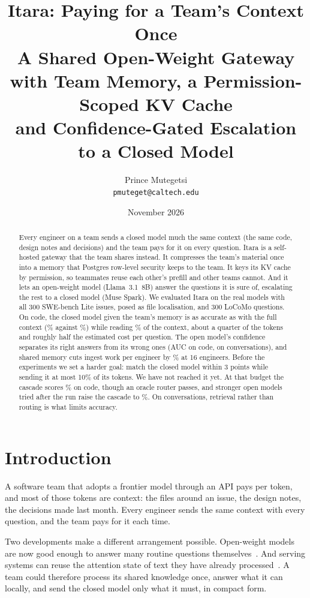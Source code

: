 \documentclass[10pt,twocolumn]{article}
\title{\textbf{Itara: Paying for a Team's Context Once}\\[2pt]
\large A Shared Open-Weight Gateway with Team Memory, a Permission-Scoped KV Cache\\ and Confidence-Gated Escalation to a Closed Model}
\author{Prince Mutegetsi\\\texttt{pmuteget@caltech.edu}}
\date{November 2026}
\begin{document}
\maketitle

\begin{abstract}
Every engineer on a team sends a closed model much the same context (the same code, design notes and decisions) and the team pays for it on every question. Itara is a self-hosted gateway that the team shares instead. It compresses the team's material once into a memory that Postgres row-level security keeps to the team. It keys its KV cache by permission, so teammates reuse each other's prefill and other teams cannot. And it lets an open-weight model (Llama~3.1~8B) answer the questions it is sure of, escalating the rest to a closed model (Muse Spark). We evaluated Itara on the real models with all 300 SWE-bench Lite issues, posed as file localisation, and 300 LoCoMo questions. On code, the closed model given the team's memory is as accurate as with the full context (\accSweCompact\% against \accSweDirect\%) while reading \% of the context, about a quarter of the tokens and roughly half the estimated cost per question. The open model's confidence separates its right answers from its wrong ones (AUC \aucSwe{} on code, \aucLoco{} on conversations), and shared memory cuts ingest work per engineer by \dropSharedRelated\% at 16 engineers. Before the experiments we set a harder goal: match the closed model within 3 points while sending it at most 10\% of its tokens. We have not reached it yet. At that budget the cascade scores \cascadeSwe\% on code, though an oracle router passes, and stronger open models tried after the run raise the cascade to \glimCascadeTen\%. On conversations, retrieval rather than routing is what limits accuracy.
\end{abstract}

\section{Introduction}

A software team that adopts a frontier model through an API pays per token, and most of those tokens are context: the files around an issue, the design notes, the decisions made last month. Every engineer sends the same context with every question, and the team pays for it each time.

Two developments make a different arrangement possible. Open-weight models are now good enough to answer many routine questions themselves~\citep{llama3}. And serving systems can reuse the attention state of text they have already processed~\citep{kwon2023vllm,zheng2024sglang,gim2024promptcache,yao2025cacheblend,liu2025lmcache}. A team could therefore process its shared knowledge once, answer what it can locally, and send the closed model only what it must, in compact form.
\end{document}
